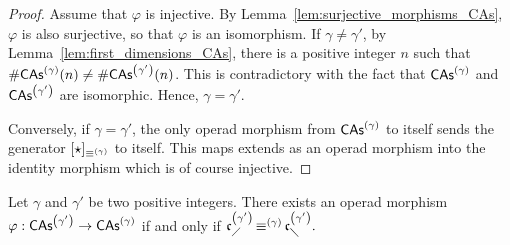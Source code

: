 \begin{proof}
    Assume that $\varphi$ is injective. By
    Lemma~\ref{lem:surjective_morphisms_CAs}, $\varphi$ is also
    surjective, so that $\varphi$ is an isomorphism. If
    $\gamma \ne \gamma'$, by Lemma~\ref{lem:first_dimensions_CAs}, there
    is a positive integer $n$ such that
    $\# \mathsf{CAs}^{\left(\gamma\right)}(n) \ne \# \mathsf{CAs}^{\left(\gamma'\right)}(n)$. This is contradictory
    with the fact that $\mathsf{CAs}^{\left(\gamma\right)}$ and $\mathsf{CAs}^{\left(\gamma'\right)}$ are
    isomorphic. Hence, $\gamma = \gamma'$.
    \smallbreak

    Conversely, if $\gamma = \gamma'$, the only operad morphism from
    $\mathsf{CAs}^{\left(\gamma\right)}$ to itself sends the generator
    $[\operatorname{\star}]_{\operatorname{\equiv}^{(\gamma)}}$ to itself. This maps extends as
    an operad morphism into the identity morphism which is of course
    injective.
\end{proof}
\medbreak

\begin{Lemma} \label{lem:morphism_CAs}
    Let $\gamma$ and $\gamma'$ be two positive integers. There exists an
    operad morphism $\varphi:\mathsf{CAs}^{\left(\gamma'\right)} \to \mathsf{CAs}^{\left(\gamma\right)}$ if and only
    if
    \begin{math}
      \mathfrak{c}^{\left(\gamma'\right)}_{\diagup} \operatorname{\equiv}^{(\gamma)} \mathfrak{c}^{\left(\gamma'\right)}_{\diagdown}.
    \end{math}
\end{Lemma}

